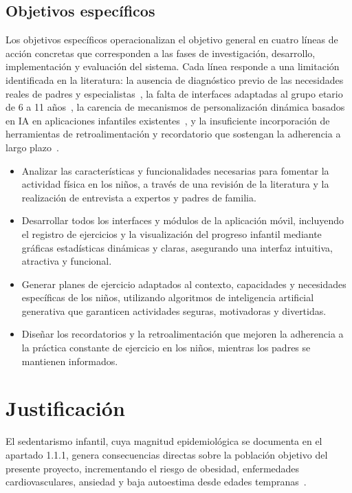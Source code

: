 			\subsection{Objetivos específicos}
				\label{objesp}
				Los objetivos específicos operacionalizan el objetivo general en cuatro líneas de acción concretas que corresponden a las fases de investigación, desarrollo, implementación y evaluación del sistema. Cada línea responde a una limitación identificada en la literatura: la ausencia de diagnóstico previo de las necesidades reales de padres y especialistas~\cite{Zhang2024}, la falta de interfaces adaptadas al grupo etario de 6 a 11 años~\cite{Hourcade2015}, la carencia de mecanismos de personalización dinámica basados en IA en aplicaciones infantiles existentes~\cite{Sengar2024}, y la insuficiente incorporación de herramientas de retroalimentación y recordatorio que sostengan la adherencia a largo plazo~\cite{WangGamif2025}.
				
				\begin{itemize}
					\item Analizar las características y funcionalidades necesarias para fomentar la actividad física en los niños, a través de una revisión de la literatura y la realización de entrevista a expertos y padres de familia.
					\item Desarrollar todos los interfaces y módulos de la aplicación móvil, incluyendo el registro de ejercicios y la visualización del progreso infantil mediante gráficas estadísticas dinámicas y claras, asegurando una interfaz intuitiva, atractiva y funcional.
					\item Generar planes de ejercicio adaptados al contexto, capacidades y necesidades específicas de los niños, utilizando algoritmos de inteligencia artificial generativa que garanticen actividades seguras, motivadoras y divertidas.
					\item Diseñar los recordatorios y la retroalimentación que mejoren la adherencia a la práctica constante de ejercicio en los niños, mientras los padres se mantienen informados.
				\end{itemize}

		\section{Justificación}
		\label{sec:just}
			El sedentarismo infantil, cuya magnitud epidemiológica se documenta en el apartado 1.1.1, genera consecuencias directas sobre la población objetivo del presente proyecto, incrementando el riesgo de obesidad, enfermedades cardiovasculares, ansiedad y baja autoestima desde edades tempranas~\cite{Wilhite2023}.
			
